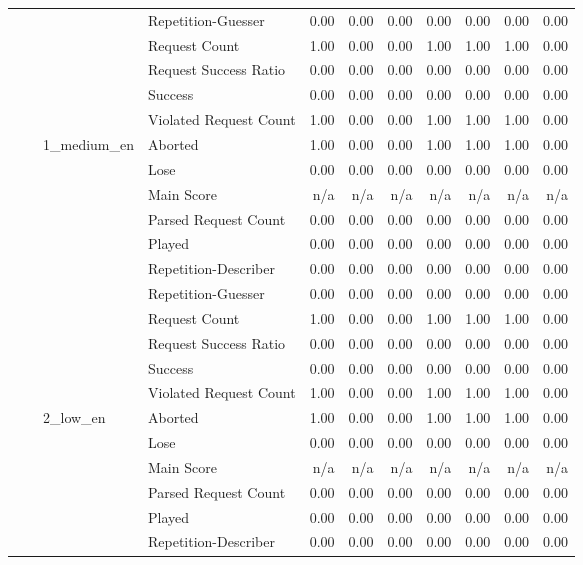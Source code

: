 \begin{tabular}{llllrrrrrrr}
 &  &  & Repetition-Guesser & 0.00 & 0.00 & 0.00 & 0.00 & 0.00 & 0.00 & 0.00 \\
 &  &  & Request Count & 1.00 & 0.00 & 0.00 & 1.00 & 1.00 & 1.00 & 0.00 \\
 &  &  & Request Success Ratio & 0.00 & 0.00 & 0.00 & 0.00 & 0.00 & 0.00 & 0.00 \\
 &  &  & Success & 0.00 & 0.00 & 0.00 & 0.00 & 0.00 & 0.00 & 0.00 \\
 &  &  & Violated Request Count & 1.00 & 0.00 & 0.00 & 1.00 & 1.00 & 1.00 & 0.00 \\
\cline{3-11}
 &  & \multirow[t]{11}{*}{1_medium_en} & Aborted & 1.00 & 0.00 & 0.00 & 1.00 & 1.00 & 1.00 & 0.00 \\
 &  &  & Lose & 0.00 & 0.00 & 0.00 & 0.00 & 0.00 & 0.00 & 0.00 \\
 &  &  & Main Score & n/a & n/a & n/a & n/a & n/a & n/a & n/a \\
 &  &  & Parsed Request Count & 0.00 & 0.00 & 0.00 & 0.00 & 0.00 & 0.00 & 0.00 \\
 &  &  & Played & 0.00 & 0.00 & 0.00 & 0.00 & 0.00 & 0.00 & 0.00 \\
 &  &  & Repetition-Describer & 0.00 & 0.00 & 0.00 & 0.00 & 0.00 & 0.00 & 0.00 \\
 &  &  & Repetition-Guesser & 0.00 & 0.00 & 0.00 & 0.00 & 0.00 & 0.00 & 0.00 \\
 &  &  & Request Count & 1.00 & 0.00 & 0.00 & 1.00 & 1.00 & 1.00 & 0.00 \\
 &  &  & Request Success Ratio & 0.00 & 0.00 & 0.00 & 0.00 & 0.00 & 0.00 & 0.00 \\
 &  &  & Success & 0.00 & 0.00 & 0.00 & 0.00 & 0.00 & 0.00 & 0.00 \\
 &  &  & Violated Request Count & 1.00 & 0.00 & 0.00 & 1.00 & 1.00 & 1.00 & 0.00 \\
\cline{3-11}
 &  & \multirow[t]{11}{*}{2_low_en} & Aborted & 1.00 & 0.00 & 0.00 & 1.00 & 1.00 & 1.00 & 0.00 \\
 &  &  & Lose & 0.00 & 0.00 & 0.00 & 0.00 & 0.00 & 0.00 & 0.00 \\
 &  &  & Main Score & n/a & n/a & n/a & n/a & n/a & n/a & n/a \\
 &  &  & Parsed Request Count & 0.00 & 0.00 & 0.00 & 0.00 & 0.00 & 0.00 & 0.00 \\
 &  &  & Played & 0.00 & 0.00 & 0.00 & 0.00 & 0.00 & 0.00 & 0.00 \\
 &  &  & Repetition-Describer & 0.00 & 0.00 & 0.00 & 0.00 & 0.00 & 0.00 & 0.00 \\

\end{tabular}
